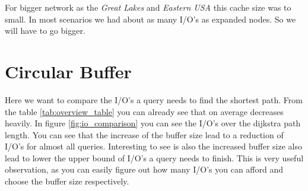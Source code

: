 For bigger network as the \textit{Great Lakes} and \textit{Eastern USA} this cache size was to small.
In most scenarios we had about as many I/O's as  expanded nodes.
So we will have to go bigger.

\section{Circular Buffer}

Here we want to compare the I/O's a query needs to find the shortest path.
From the table \ref{tab:overview_table} you can already see that on average decreases heavily.
In figure \ref{fig:io_comparison} you can see the I/O's over the dijkstra path length.
You can see that the increase of the buffer size lead to a reduction of I/O's for almost all queries.
Interesting to see is also the increased buffer size also lead to lower the upper bound of I/O's a query needs to finish.
This is very useful observation,
as you can easily figure out how many I/O's you can afford and choose the buffer size respectively.






